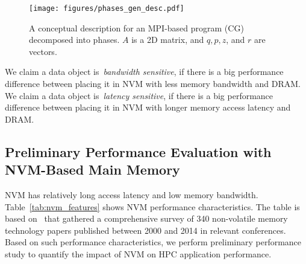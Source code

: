 \begin{figure}
\centering
\texttt{[image: figures/phases\_gen\_desc.pdf]}
\vspace{-5pt}
\caption{A conceptual description for an MPI-based program (CG) decomposed into phases. $A$ is a 2D matrix, and $q, p, z$, and $r$ are vectors.}
\label{fig:phases_gen_desc}
\vspace{-15pt}
\end{figure}

We claim a data object is~\textit{bandwidth sensitive}, if there is a big performance difference between placing it in %
NVM with less memory bandwidth and DRAM.
We claim a data object is~\textit{latency sensitive}, if there is
a big performance difference between placing it in %
NVM with longer memory access latency and DRAM.

\subsection{Preliminary Performance Evaluation with NVM-Based Main Memory}
NVM has relatively long access latency and low memory bandwidth.
Table~\ref{tab:nvm_features} shows NVM performance characteristics.
The table is based on~\cite{NVMDB} that gathered a comprehensive survey of 340 non-volatile memory technology papers published between 2000 and 2014 in relevant conferences.
Based on such performance characteristics, we perform preliminary performance study
to quantify the impact of NVM on HPC application performance.

